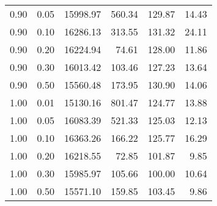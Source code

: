 \begin{table}
\begin{tabular}{rrrrrr}
0.90 & 0.05 & 15998.97 & 560.34 & 129.87 & 14.43 \\
0.90 & 0.10 & 16286.13 & 313.55 & 131.32 & 24.11 \\
0.90 & 0.20 & 16224.94 & 74.61 & 128.00 & 11.86 \\
0.90 & 0.30 & 16013.42 & 103.46 & 127.23 & 13.64 \\
0.90 & 0.50 & 15560.48 & 173.95 & 130.90 & 14.06 \\
1.00 & 0.01 & 15130.16 & 801.47 & 124.77 & 13.88 \\
1.00 & 0.05 & 16083.39 & 521.33 & 125.03 & 12.13 \\
1.00 & 0.10 & 16363.26 & 166.22 & 125.77 & 16.29 \\
1.00 & 0.20 & 16218.55 & 72.85 & 101.87 & 9.85 \\
1.00 & 0.30 & 15985.97 & 105.66 & 100.00 & 10.64 \\
1.00 & 0.50 & 15571.10 & 159.85 & 103.45 & 9.86 \\
\bottomrule
\end{tabular}
\end{table}
